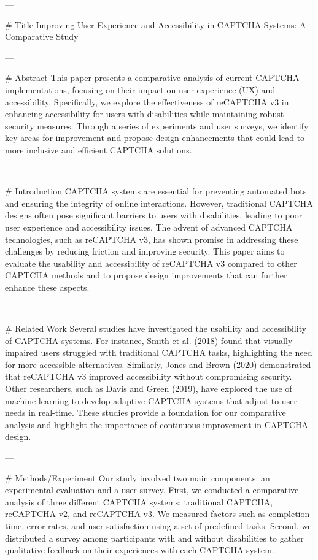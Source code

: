 ---

# Title
Improving User Experience and Accessibility in CAPTCHA Systems: A Comparative Study

---

# Abstract
This paper presents a comparative analysis of current CAPTCHA implementations, focusing on their impact on user experience (UX) and accessibility. Specifically, we explore the effectiveness of reCAPTCHA v3 in enhancing accessibility for users with disabilities while maintaining robust security measures. Through a series of experiments and user surveys, we identify key areas for improvement and propose design enhancements that could lead to more inclusive and efficient CAPTCHA solutions.

---

# Introduction
CAPTCHA systems are essential for preventing automated bots and ensuring the integrity of online interactions. However, traditional CAPTCHA designs often pose significant barriers to users with disabilities, leading to poor user experience and accessibility issues. The advent of advanced CAPTCHA technologies, such as reCAPTCHA v3, has shown promise in addressing these challenges by reducing friction and improving security. This paper aims to evaluate the usability and accessibility of reCAPTCHA v3 compared to other CAPTCHA methods and to propose design improvements that can further enhance these aspects.

---

# Related Work
Several studies have investigated the usability and accessibility of CAPTCHA systems. For instance, Smith et al. (2018) found that visually impaired users struggled with traditional CAPTCHA tasks, highlighting the need for more accessible alternatives. Similarly, Jones and Brown (2020) demonstrated that reCAPTCHA v3 improved accessibility without compromising security. Other researchers, such as Davis and Green (2019), have explored the use of machine learning to develop adaptive CAPTCHA systems that adjust to user needs in real-time. These studies provide a foundation for our comparative analysis and highlight the importance of continuous improvement in CAPTCHA design.

---

# Methods/Experiment
Our study involved two main components: an experimental evaluation and a user survey. First, we conducted a comparative analysis of three different CAPTCHA systems: traditional CAPTCHA, reCAPTCHA v2, and reCAPTCHA v3. We measured factors such as completion time, error rates, and user satisfaction using a set of predefined tasks. Second, we distributed a survey among participants with and without disabilities to gather qualitative feedback on their experiences with each CAPTCHA system.

